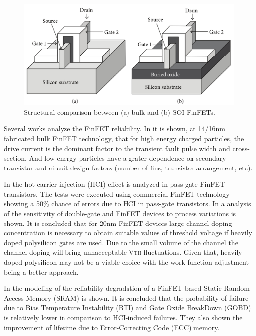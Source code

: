 \documentclass[ecp,tc, english]{iiufrgs}
\begin{document}
\begin{figure}[H]
\centering
\includegraphics[width=\textwidth, trim={0 0cm 0 0cm},clip]{finfet2.png}
\caption{Structural comparison between (a) bulk and (b) SOI FinFETs.}
\label{bulkvssoi}
\end{figure}



Several works analyze the FinFET reliability. In \cite{FinFET01} it is shown, at 14/16nm fabricated bulk FinFET technology, that for high energy charged particles, the drive current is the dominant factor to the transient fault pulse width and cross-section. And low energy particles have a grater dependence on secondary transistor and circuit design factors (number of fins, transistor arrangement, etc). 

In \cite{FinFET02} the hot carrier injection (HCI) effect is analyzed in pass-gate FinFET transistors. The tests were executed using commercial FinFET technology showing a 50\% chance of errors due to HCI in pass-gate transistors. In \cite{FinFET03} a analysis of the sensitivity of double-gate and FinFET devices to process variations is shown. It is concluded that for 20nm FinFET devices large channel doping concentration is necessary to obtain suitable values of threshold voltage if heavily doped polysilicon gates are used. Due to the small volume of the channel the channel doping will bring unnacceptable V\textsc{th} fluctuations. Given that, heavily doped polysilicon may not be a viable choice with the work function adjustment being a better approach. 

In \cite{FinFET04} the modeling of the reliability degradation of a FinFET-based Static Random Access Memory (SRAM) is shown. It is concluded that the probability of failure due to Bias Temperature Instability (BTI) and Gate Oxide BreakDown (GOBD) is relatively lower in comparison to HCI-induced failures. They also shown the improvement of lifetime due to Error-Correcting Code (ECC) memory. 
\end{document}
